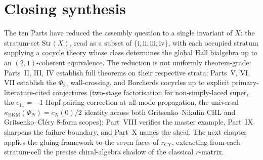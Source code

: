\documentclass[11pt]{amsart}
\theoremstyle{definition}
\providecommand{\Str}{\mathrm{Str}}
\providecommand{\kBKM}{\kappa_{\mathrm{BKM}}}
\providecommand{\CY}{\mathrm{CY}}
\begin{document}





\part*{Closing synthesis}

The ten Parts have reduced the assembly question to a single invariant of $X$:
the stratum-set $\Str(X)$, read as a subset of $\{\mathrm{i}, \mathrm{ii},
\mathrm{iii}, \mathrm{iv}\}$, with each occupied stratum supplying a cocycle
theory whose class determines the global Hall bialgebra up to an
$(2,1)$-coherent equivalence. The reduction is not uniformly theorem-grade:
Parts~II, III, IV establish full theorems on their respective strata;
Parts~V, VI, VII establish the $\Phi_3$, wall-crossing, and Borcherds
cocycles up to explicit primary-literature-cited conjectures (two-stage
factorisation for non-simply-laced super, the $c_{11} = -1$ Hopf-pairing
correction at all-mode propagation, the universal $\kBKM(\Phi_N) = c_N(0)/2$
identity across both Gritsenko--Nikulin CHL and Gritsenko--Cl\'ery 8-form
scopes); Part~VIII verifies the master example, Part~IX sharpens the failure
boundary, and Part~X names the sheaf. The next chapter applies the gluing
framework to the seven faces of $r_{\CY}$, extracting from each stratum-cell
the precise chiral-algebra shadow of the classical $r$-matrix.
\end{document}
